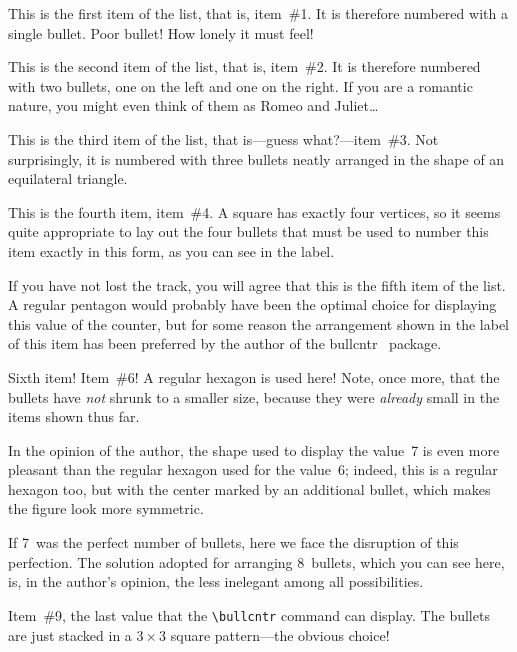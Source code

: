 \documentclass[a4paper]{article}
\DeclareRobustCommand*{\packlass}[1]{%
	{\texorpdfstring{\normalfont \sffamily}{}#1}%
}
\newcommand*{\Bullcntr}{bullcntr}
\newcommand*{\bull}{\packlass{\Bullcntr}}
\newcommand*{\tbull}{the \bull\ package}
\begin{document}
\begin{bullenum}
	\smallctrbull

	\item
		This is the first item of the list, that is, item~\#1.  It is
		therefore numbered with a single bullet.  Poor bullet!  How
		lonely it must feel!

	\item
		This is the second item of the list, that is, item~\#2.  It is
		therefore numbered with two bullets, one on the left and one
		on the right.  If you are a romantic nature, you might even
		think of them as Romeo and Juliet\ldots

	\item\label{Small-3}
		This is the third item of the list, that is---guess
		what?---item~\#3.  Not surprisingly, it is numbered with three
		bullets neatly arranged in the shape of an equilateral
		triangle.

	\item
		This is the fourth item, item~\#4.  A square has exactly four
		vertices, so it seems quite appropriate to lay out the four
		bullets that must be used to number this item exactly in this
		form, as you can see in the label.

	\item
		If you have not lost the track, you will agree that this is
		the fifth item of the list.  A regular pentagon would probably
		have been the optimal choice for displaying this value of the
		counter, but for some reason the arrangement shown in the
		label of this item has been preferred by the author of \tbull.

	\item\label{Small-6}
		Sixth item!  Item~\#6!  A regular hexagon is used here!  Note,
		once more, that the bullets have \emph{not} shrunk to a
		smaller size, because they were \emph{already} small in the
		items shown thus far.

	\item
		In the opinion of the author, the shape used to display the
		value~7 is even more pleasant than the regular hexagon used
		for the value~6; indeed, this is a regular hexagon too, but
		with the center marked by an additional bullet, which makes
		the figure look more symmetric.

	\item
		If 7~was the perfect number of bullets, here we face the
		disruption of this perfection.  The solution adopted for
		arranging 8~bullets, which you can see here, is, in the
		author's opinion, the less inelegant among all possibilities.

	\item
		Item~\#9, the last value that the \verb|\bullcntr| command can
		display.  The bullets are just stacked in a $3\times3$ square
		pattern---the obvious choice!
\end{bullenum}
\end{document}
